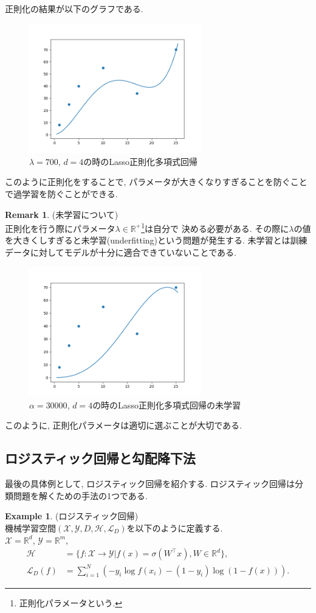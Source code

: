 \documentclass[11pt, a4paper, dvipdfmx]{jsarticle}
\theoremstyle{definition}
\newtheorem{Example+}[Axiom+]{Example}
\newtheorem{Remark+}[Axiom+]{Remark}
\newcommand{\R}{\mathbb{R}}
\newcommand{\X}{\mathcal{X}}
\newcommand{\Y}{\mathcal{Y}}
\newcommand{\Hil}{\mathcal{H}}
\newcommand{\Loss}{\mathcal{L}_{D}}
\newcommand{\MLsp}{(\X, \Y, D, \Hil, \Loss)}
\begin{document}
正則化の結果が以下のグラフである.
\begin{figure}[H]
    \centering
    \includegraphics[width = 7.5cm]{regulaer_PR.png}
    \caption{$\lambda = 700$, $d = 4$の時のLasso正則化多項式回帰}
\end{figure}
このように正則化をすることで, パラメータが大きくなりすぎることを防ぐことで過学習を防ぐことができる.
\begin{Remark+}(未学習について)\\
    正則化を行う際にパラメータ$\lambda\in\R^+$\footnote{正則化パラメータという.}は自分で
    決める必要がある. その際に$\lambda$の値を大きくしすぎると未学習(underfitting)という問題が発生する.
    未学習とは訓練データに対してモデルが十分に適合できていないことである.
    \begin{figure}[H]
        \centering
        \includegraphics[width=7.5cm]{underfitting_PR.png}
        \caption{$\alpha = 30000$, $d = 4$の時のLasso正則化多項式回帰の未学習}
    \end{figure}
    このように, 正則化パラメータは適切に選ぶことが大切である. 
\end{Remark+}
\subsection{ロジスティック回帰と勾配降下法}
最後の具体例として, ロジスティック回帰を紹介する. 
ロジスティック回帰は分類問題を解くための手法の1つである. 
\begin{Example+}(ロジスティック回帰)\\
    機械学習空間$\MLsp$を以下のように定義する.\\
    $\X=\R^d$, $\Y = \R^m$, 
    \begin{align*}
        \Hil &= \{f:\X\to\Y | f(x) = \sigma(W^{\top}x), W\in\R^d\},\\
        \Loss(f) &= \sum_{i = 1}^{N}(-y_{i}\log f(x_{i}) - (1 - y_{i})\log(1 - f(x))).
    \end{align*}
\end{Example+}
\end{document}
